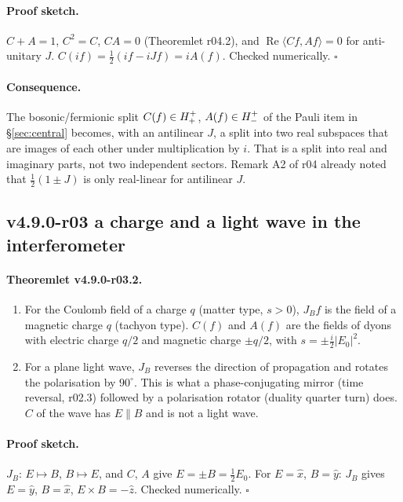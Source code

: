 \paragraph{Proof sketch.}
\(C+A=1\), \(C^2=C\), \(CA=0\) (Theoremlet r04.2), and \(\operatorname{Re}\langle Cf,Af\rangle=0\) for anti-unitary \(J\).
\(C(if)=\tfrac12(if-iJf)=iA(f)\).  Checked numerically.  \(\square\)

\paragraph{Consequence.}
The bosonic/fermionic split \(C(f)\in H^+_+\), \(A(f)\in H^+_-\) of the Pauli item in
\S\ref{sec:central} becomes, with an antilinear \(J\), a split into two real subspaces that are images of each other
under multiplication by \(i\).  That is a split into real and imaginary parts, not two independent sectors.  Remark A2 of
r04 already noted that \(\tfrac12(1\pm J)\) is only real-linear for antilinear \(J\).

\subsection*{v4.9.0-r03 a charge and a light wave in the interferometer}
\label{subsec:v490-r03-charge-light}

\paragraph{Theoremlet v4.9.0-r03.2.}
\begin{enumerate}[leftmargin=2em]
\item[(a)] For the Coulomb field of a charge \(q\) (matter type, \(s>0\)), \(J_Bf\) is the field of a magnetic charge
\(q\) (tachyon type).  \(C(f)\) and \(A(f)\) are the fields of dyons with electric charge \(q/2\) and magnetic charge
\(\pm q/2\), with \(s=\pm\tfrac i2|E_0|^2\).
\item[(b)] For a plane light wave, \(J_B\) reverses the direction of propagation and rotates the polarisation by
\(90^\circ\).  This is what a phase-conjugating mirror (time reversal, r02.3) followed by a polarisation rotator (duality
quarter turn) does.  \(C\) of the wave has \(E\parallel B\) and is not a light wave.
\end{enumerate}

\paragraph{Proof sketch.}
\(J_B\): \(E\mapsto B\), \(B\mapsto E\), and \(C\), \(A\) give \(E=\pm B=\tfrac12E_0\).  For \(E=\hat x\), \(B=\hat y\):
\(J_B\) gives \(E=\hat y\), \(B=\hat x\), \(E\times B=-\hat z\).  Checked numerically.  \(\square\)

